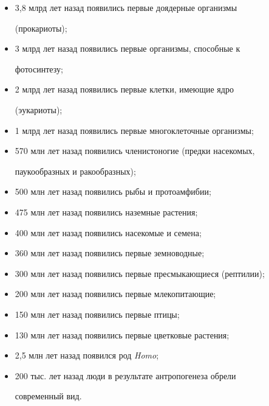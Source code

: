    \begin{itemize}


\item 3,8 млрд лет назад появились первые доядерные организмы 


(прокариоты);\\[-13pt]


\item 3 млрд лет назад появились первые организмы, способные к 


фотосинтезу;\\[-13pt]


\item 2 млрд лет назад появились первые клетки, имеющие ядро 


(эукариоты);\\[-13pt]


\item 1 млрд лет назад появились первые многоклеточные организмы;\\[-13pt]


\item 570 млн лет назад появились членистоногие (предки насекомых, 


паукообразных и ракообразных);\\[-13pt]


\item 500 млн лет назад появились рыбы и протоамфибии;\\[-13pt]


\item 475 млн лет назад появились наземные растения;\\[-13pt]


\item 400 млн лет назад появились насекомые и семена;\\[-13pt]


\item 360 млн лет назад появились первые земноводные;\\[-13pt]


\item 300 млн лет назад появились первые пресмыкающиеся (рептилии);\\[-13pt]


\item 200 млн лет назад появились первые млекопитающие;\\[-13pt]


\item 150 млн лет назад появились первые птицы;\\[-13pt]


\item 130 млн лет назад появились первые цветковые растения;\\[-13pt]


\item 2,5 млн лет назад появился род \textit{Homo};\\[-13pt]


\item 200 тыс. лет назад люди в результате антропогенеза обрели 


современный вид.


\end{itemize}





